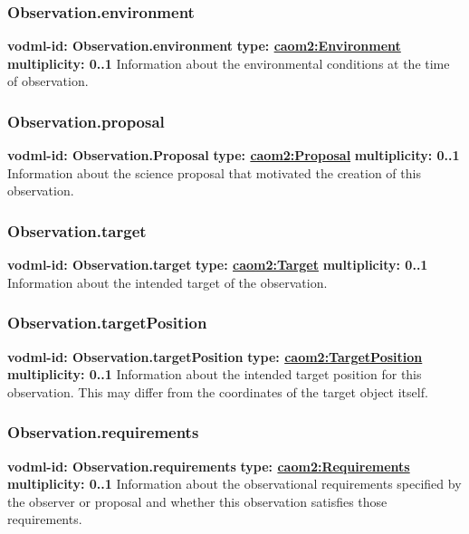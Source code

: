     \subsubsection{Observation.environment}
      \textbf{vodml-id: Observation.environment} \newline
      \textbf{type: \hyperref[sect:Environment]{caom2:Environment}} \newline
      \textbf{multiplicity: 0..1} \newline
      Information about the environmental conditions at the time of observation.

    \subsubsection{Observation.proposal}
      \textbf{vodml-id: Observation.Proposal} \newline
      \textbf{type: \hyperref[sect:Proposal]{caom2:Proposal}} \newline
      \textbf{multiplicity: 0..1} \newline
      Information about the science proposal that motivated the creation of this observation.

    \subsubsection{Observation.target}
      \textbf{vodml-id: Observation.target} \newline
      \textbf{type: \hyperref[sect:Target]{caom2:Target}} \newline
      \textbf{multiplicity: 0..1} \newline
      Information about the intended target of the observation.

    \subsubsection{Observation.targetPosition}
      \textbf{vodml-id: Observation.targetPosition} \newline
      \textbf{type: \hyperref[sect:TargetPosition]{caom2:TargetPosition}} \newline
      \textbf{multiplicity: 0..1} \newline
      Information about the intended target position for this observation. This may differ from the coordinates of the target object itself.

    \subsubsection{Observation.requirements}
      \textbf{vodml-id: Observation.requirements} \newline
      \textbf{type: \hyperref[sect:Requirements]{caom2:Requirements}} \newline
      \textbf{multiplicity: 0..1} \newline
      Information about the observational requirements specified by the observer or proposal and whether this observation satisfies those requirements.

